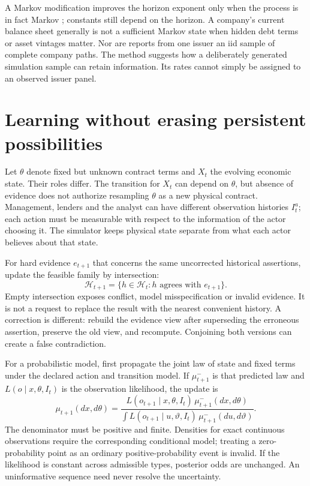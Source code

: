 \documentclass[11pt,a4paper]{article}
\begin{document}
A Markov modification improves the horizon exponent only when the process
is in fact Markov \cite[Theorem~6.1]{estimation}; constants still depend on
the horizon. A company's current balance sheet generally is not a sufficient
Markov state when hidden debt terms or asset vintages matter. Nor are reports
from one issuer an iid sample of complete company paths. The method suggests
how a deliberately generated simulation sample can retain information. Its
rates cannot simply be assigned to an observed issuer panel.

\section{Learning without erasing persistent possibilities}
Let $\theta$ denote fixed but unknown contract terms and $X_t$ the evolving
economic state. Their roles differ. The transition for $X_t$ can depend on
$\theta$, but absence of evidence does not authorize resampling $\theta$
as a new physical contract. Management, lenders and the analyst can have
different observation histories $I_t^a$; each action must be measurable with
respect to the information of the actor choosing it. The simulator keeps
physical state separate from what each actor believes about that state.

For hard evidence $e_{t+1}$ that concerns the same uncorrected historical
assertions, update the feasible family by intersection:
\begin{equation}
\mathcal H_{t+1}=\{h\in\mathcal H_t:h\text{ agrees with }e_{t+1}\}.
\end{equation}
Empty intersection exposes conflict, model misspecification or invalid
evidence. It is not a request to replace the result with the nearest convenient
history. A correction is different: rebuild the evidence view after
superseding the erroneous assertion, preserve the old view, and recompute.
Conjoining both versions can create a false contradiction.

For a probabilistic model, first propagate the joint law of state and fixed
terms under the declared action and transition model. If $\mu^-_{t+1}$ is
that predicted law and $L(o\mid x,\theta,I_t)$ is the observation likelihood,
the update is
\begin{equation}\label{eq:bayes}
\mu_{t+1}(dx,d\theta)=
\frac{L(o_{t+1}\mid x,\theta,I_t)\,\mu^-_{t+1}(dx,d\theta)}
{\int L(o_{t+1}\mid u,\vartheta,I_t)\,\mu^-_{t+1}(du,d\vartheta)}.
\end{equation}
The denominator must be positive and finite. Densities for exact continuous
observations require the corresponding conditional model; treating a
zero-probability point as an ordinary positive-probability event is invalid.
If the likelihood is constant across admissible types, posterior odds are
unchanged. An uninformative sequence need never resolve the uncertainty.
\end{document}
